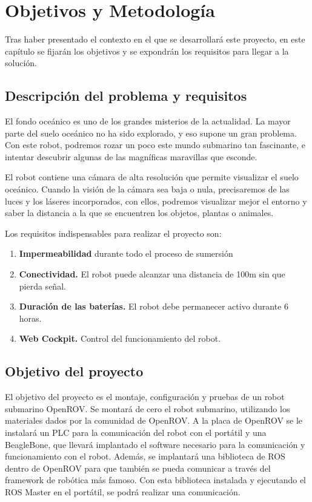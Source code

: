 \chapter{Objetivos y Metodología}
\label{cap:objetivos}
Tras haber presentado el contexto en el que se desarrollará este proyecto, en este capítulo se fijarán los objetivos y se expondrán los requisitos para llegar a la solución.
\section{Descripción del problema y requisitos}
\label{sec:descripciondelproblema}

El fondo oceánico es uno de los grandes misterios de la actualidad. La mayor parte del suelo oceánico no ha sido explorado, y eso supone un gran problema. Con este robot, podremos rozar un poco este mundo submarino tan fascinante, e intentar descubrir algunas de las magníficas maravillas que esconde.

El robot contiene una cámara de alta resolución que permite visualizar el suelo oceánico. Cuando la visión de la cámara sea baja o nula, precisaremos de las luces y los láseres incorporados, con ellos, podremos visualizar mejor el entorno y saber la distancia a la que se encuentren los objetos, plantas o animales. 

Los requisitos indispensables para realizar el proyecto son:
\begin{enumerate}
\item \textbf{Impermeabilidad} durante todo el proceso de sumersión
\item \textbf{Conectividad.} El robot puede alcanzar una distancia de 100m sin que pierda señal.
\item \textbf{Duración de las baterías.} El robot debe permanecer activo durante 6 horas. 
\item \textbf{Web Cockpit.} Control del funcionamiento del robot.
\end{enumerate}

\section{Objetivo del proyecto}
\label{sec:objetivos}

El objetivo del proyecto es el montaje, configuración y pruebas de un robot submarino OpenROV. 
Se montará de cero el robot submarino, utilizando los materiales dados por la comunidad de OpenROV. A la placa de OpenROV se le instalará un PLC para la comunicación del robot con el portátil y una BeagleBone, que llevará implantado el software necesario para la comunicación y funcionamiento con el robot.
Además, se implantará una biblioteca de ROS dentro de OpenROV para que también se pueda comunicar a través del framework de robótica más famoso. Con esta biblioteca instalada y ejecutando el ROS Master en el portátil, se podrá realizar una comunicación.

